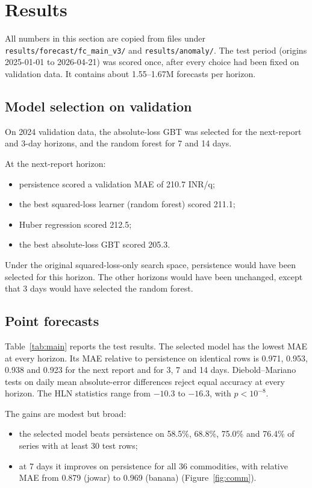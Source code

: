 \section{Results}\label{sec:results}

All numbers in this section are copied from files under \texttt{results/forecast/fc\_main\_v3/} and \texttt{results/anomaly/}.
The test period (origins 2025-01-01 to 2026-04-21) was scored once, after every choice had been fixed on validation data.
It contains about 1.55--1.67M forecasts per horizon.

\subsection{Model selection on validation}
On 2024 validation data, the absolute-loss GBT was selected for the next-report and 3-day horizons, and the random forest for 7 and 14 days.

At the next-report horizon:
\begin{itemize}
  \item persistence scored a validation MAE of \SI{210.7}{} INR/q;
  \item the best squared-loss learner (random forest) scored 211.1;
  \item Huber regression scored 212.5;
  \item the best absolute-loss GBT scored 205.3.
\end{itemize}
Under the original squared-loss-only search space, persistence would have been selected for this horizon.
The other horizons would have been unchanged, except that 3 days would have selected the random forest.

\subsection{Point forecasts}
Table~\ref{tab:main} reports the test results.
The selected model has the lowest MAE at every horizon.
Its MAE relative to persistence on identical rows is 0.971, 0.953, 0.938 and 0.923 for the next report and for 3, 7 and 14 days.
Diebold--Mariano tests on daily mean absolute-error differences reject equal accuracy at every horizon.
The HLN statistics range from $-10.3$ to $-16.3$, with $p<10^{-8}$.

The gains are modest but broad:
\begin{itemize}
  \item the selected model beats persistence on 58.5\%, 68.8\%, 75.0\% and 76.4\% of series with at least 30 test rows;
  \item at 7 days it improves on persistence for all 36 commodities, with relative MAE from 0.879 (jowar) to 0.969 (banana) (Figure~\ref{fig:comm}).
\end{itemize}

